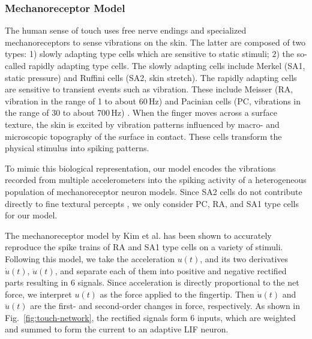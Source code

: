 \subsubsection{Mechanoreceptor Model}

\newcommand{\gammafactor}{\mbox{\it $\Gamma$-factor} (GF)}

The human sense of touch uses free nerve endings and specialized mechanoreceptors to sense vibrations on the skin. The latter are composed of two types: 1) slowly adapting type cells which are sensitive to static stimuli; 2) the so-called rapidly adapting type cells. The slowly adapting cells include Merkel (SA1, static pressure) and Ruffini cells (SA2, skin stretch). The rapidly adapting cells are sensitive to transient events such as vibration. These include Meisser (RA, vibration in the range of 1 to about 60\,Hz) and Pacinian cells (PC, vibrations in the range of 30 to about 700\,Hz) \cite{johansson2009coding}. When the finger moves across a surface texture, the skin is excited by vibration patterns influenced by macro- and microscopic topography of the surface in contact. These cells transform the physical stimulus into spiking patterns.

To mimic this biological representation, our model encodes the vibrations recorded from multiple accelerometers into the spiking activity of a heterogeneous population of mechanoreceptor neuron models.  Since SA2 cells do not contribute directly to fine textural percepts \cite{weber2013spatial}, we only consider PC,  RA, and SA1 type cells for our model. 


The mechanoreceptor model by Kim et al. \cite{kim2011does} has been shown to accurately reproduce the spike trains of RA and SA1 type cells on a variety of stimuli.  Following this model, we take the acceleration $u(t)$, and its two derivatives $\dot{u}(t)$, $\ddot{u}(t)$, and separate each of them into positive and negative rectified parts resulting in $6$ signals. %
Since acceleration is directly proportional to the net force, we interpret $u(t)$ as the force applied to the fingertip.
Then $\dot{u}(t)$ and $\ddot{u}(t)$ are the first- and second-order changes in force, respectively.  As shown in \mbox{Fig. \ref{fig:touch-network}}, the rectified signals form 6 inputs, which are weighted and summed to form the current to an adaptive LIF neuron.

